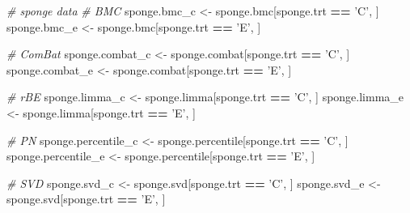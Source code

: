 \documentclass[]{book}
\newenvironment{Shaded}{\begin{snugshade}}{\end{snugshade}}
\newcommand{\StringTok}[1]{\textcolor[rgb]{0.31,0.60,0.02}{#1}}
\newcommand{\CommentTok}[1]{\textcolor[rgb]{0.56,0.35,0.01}{\textit{#1}}}
\newcommand{\OperatorTok}[1]{\textcolor[rgb]{0.81,0.36,0.00}{\textbf{#1}}}
\newcommand{\NormalTok}[1]{#1}
\begin{document}
\begin{Shaded}
\begin{Highlighting}[]
\CommentTok{# sponge data}
\CommentTok{# BMC}
\NormalTok{sponge.bmc_c <-}\StringTok{ }\NormalTok{sponge.bmc[sponge.trt }\OperatorTok{==}\StringTok{ 'C'}\NormalTok{, ]}
\NormalTok{sponge.bmc_e <-}\StringTok{ }\NormalTok{sponge.bmc[sponge.trt }\OperatorTok{==}\StringTok{ 'E'}\NormalTok{, ] }

\CommentTok{# ComBat}
\NormalTok{sponge.combat_c <-}\StringTok{ }\NormalTok{sponge.combat[sponge.trt }\OperatorTok{==}\StringTok{ 'C'}\NormalTok{, ]}
\NormalTok{sponge.combat_e <-}\StringTok{ }\NormalTok{sponge.combat[sponge.trt }\OperatorTok{==}\StringTok{ 'E'}\NormalTok{, ] }

\CommentTok{# rBE}
\NormalTok{sponge.limma_c <-}\StringTok{ }\NormalTok{sponge.limma[sponge.trt }\OperatorTok{==}\StringTok{ 'C'}\NormalTok{, ]}
\NormalTok{sponge.limma_e <-}\StringTok{ }\NormalTok{sponge.limma[sponge.trt }\OperatorTok{==}\StringTok{ 'E'}\NormalTok{, ] }

\CommentTok{# PN}
\NormalTok{sponge.percentile_c <-}\StringTok{ }\NormalTok{sponge.percentile[sponge.trt }\OperatorTok{==}\StringTok{ 'C'}\NormalTok{, ]}
\NormalTok{sponge.percentile_e <-}\StringTok{ }\NormalTok{sponge.percentile[sponge.trt }\OperatorTok{==}\StringTok{ 'E'}\NormalTok{, ] }

\CommentTok{# SVD}
\NormalTok{sponge.svd_c <-}\StringTok{ }\NormalTok{sponge.svd[sponge.trt }\OperatorTok{==}\StringTok{ 'C'}\NormalTok{, ]}
\NormalTok{sponge.svd_e <-}\StringTok{ }\NormalTok{sponge.svd[sponge.trt }\OperatorTok{==}\StringTok{ 'E'}\NormalTok{, ] }
\end{Highlighting}
\end{Shaded}
\end{document}
